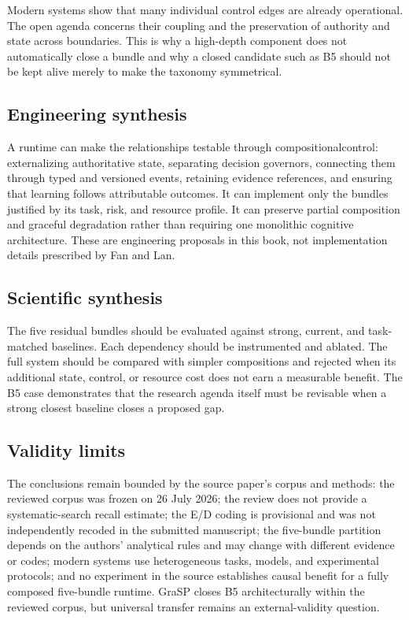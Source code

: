 Modern systems show that many individual control edges are already operational. The open agenda concerns their coupling and the preservation of authority and state across boundaries. This is why a high-depth component does not automatically close a bundle and why a closed candidate such as B5 should not be kept alive merely to make the taxonomy symmetrical.

\subsection{Engineering synthesis}
\label{subsec:ch18-engineering-synthesis}

A runtime can make the relationships testable through \gls{compositionalcontrol}: externalizing authoritative state, separating decision governors, connecting them through typed and versioned events, retaining evidence references, and ensuring that learning follows attributable outcomes. It can implement only the bundles justified by its task, risk, and resource profile. It can preserve partial composition and graceful degradation rather than requiring one monolithic cognitive architecture. These are engineering proposals in this book, not implementation details prescribed by Fan and Lan.

\subsection{Scientific synthesis}
\label{subsec:ch18-scientific-synthesis}

The five residual bundles should be evaluated against strong, current, and task-matched baselines. Each dependency should be instrumented and ablated. The full system should be compared with simpler compositions and rejected when its additional state, control, or resource cost does not earn a measurable benefit. The B5 case demonstrates that the research agenda itself must be revisable when a strong closest baseline closes a proposed gap.

\subsection{Validity limits}
\label{subsec:ch18-validity-limits}

The conclusions remain bounded by the source paper's corpus and methods: the reviewed corpus was frozen on 26 July 2026; the review does not provide a systematic-search recall estimate; the E/D coding is provisional and was not independently recoded in the submitted manuscript; the five-bundle partition depends on the authors' analytical rules and may change with different evidence or codes; modern systems use heterogeneous tasks, models, and experimental protocols; and no experiment in the source establishes causal benefit for a fully composed five-bundle runtime. GraSP closes B5 architecturally within the reviewed corpus, but universal transfer remains an external-validity question.

